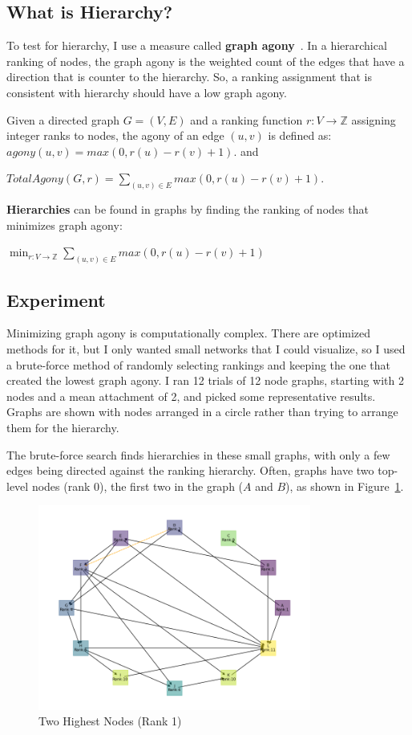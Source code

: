 \documentclass[12pt]{article}
\begin{document}
\subsection{What is Hierarchy?}

To test for hierarchy, I use a measure called \textbf{graph agony}~\cite{tatti2014faster}. In a hierarchical ranking of nodes, the graph agony
is the weighted count of the edges that have a direction that is counter to the
hierarchy. So, a ranking assignment that is consistent with hierarchy should have a low graph agony.

Given a directed graph $G=(V,E)$ and a
ranking function $r:V \rightarrow \mathbb{Z}$ assigning integer ranks to nodes,
the agony of an edge $(u,v)$ is defined as:
$agony(u,v)=max(0,r(u) - r(v)+1)$. and

$Total Agony(G,r)= \sum_{(u,v) \in E} max(0,r(u) - r(v)+1)$.

\textbf{Hierarchies} can be found in graphs by finding the ranking of nodes that minimizes graph agony:

$\min_{r : V \to \mathbb{Z}} \sum_{(u,v) \in E} max(0,r(u) - r(v)+1)$

\subsection{Experiment}

Minimizing graph agony is computationally complex. There are optimized methods for it, but I only wanted small
networks that I could visualize, so I used a brute-force method of randomly selecting rankings and keeping the one
that created the lowest graph agony. I ran 12 trials of 12 node graphs, starting with 2 nodes and a mean attachment of
2, and picked some representative results. Graphs are shown with nodes arranged in a circle
rather than trying to arrange them for the hierarchy.

The brute-force search finds hierarchies in these small graphs,
with only a few edges being directed against the ranking
hierarchy. Often, graphs have two top-level nodes (rank 0), the first two in the graph ($A$ and $B$), as shown
in Figure~\ref{fig:multiple-highest-nodes}.
\begin{figure}[H]
    \centering
    \includegraphics[width=0.8\textwidth]{images/2025-06-01-15:51:09.145097-network.png}
    \caption{Two Highest Nodes (Rank 1)}
    \label{fig:multiple-highest-nodes}
\end{figure}
\end{document}
